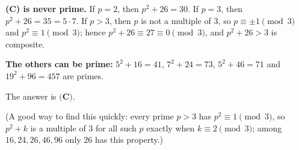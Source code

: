 \textbf{(C) is never prime.} If $p=2$, then $p^2+26=30$. If $p=3$, then $p^2+26=35=5\cdot7$. If $p>3$, then $p$ is not a multiple of $3$, so $p\equiv\pm1\pmod3$ and $p^2\equiv1\pmod3$; hence $p^2+26\equiv27\equiv0\pmod3$, and $p^2+26>3$ is composite.

\textbf{The others can be prime:} $5^2+16=41$, $7^2+24=73$, $5^2+46=71$ and $19^2+96=457$ are primes.

The answer is $\boxed{\textbf{(C)}}$.

(A good way to find this quickly: every prime $p>3$ has $p^2\equiv1\pmod3$, so $p^2+k$ is a multiple of $3$ for all such $p$ exactly when $k\equiv2\pmod3$; among $16,24,26,46,96$ only $26$ has this property.)
